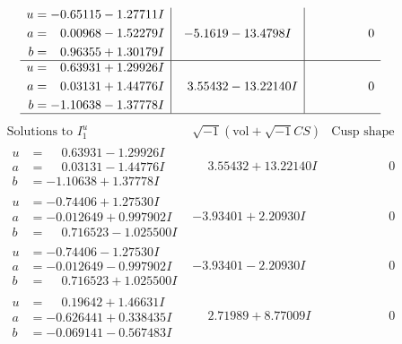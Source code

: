 \documentclass[1p]{elsarticle_modified}
\theoremstyle{definition}
\newcommand{\I}{\sqrt{-1}}
\begin{document}
$$\begin{array}{c|c|c}
\begin{aligned}
u &= -0.65115 - 1.27711 I \\
a &= \phantom{-}0.00968 - 1.52279 I \\
b &= \phantom{-}0.96355 + 1.30179 I\end{aligned}
 & -5.1619 - 13.4798 I & \phantom{-0.000000 } 0 \\ \hline\begin{aligned}
u &= \phantom{-}0.63931 + 1.29926 I \\
a &= \phantom{-}0.03131 + 1.44776 I \\
b &= -1.10638 - 1.37778 I\end{aligned}
 & \phantom{-}3.55432 - 13.22140 I & \phantom{-0.000000 } 0\\
 \hline 
 \end{array}$$\newpage$$\begin{array}{c|c|c}  
\text{Solutions to }I^u_{1}& \I (\text{vol} + \sqrt{-1}CS) & \text{Cusp shape}\\
 \hline 
\begin{aligned}
u &= \phantom{-}0.63931 - 1.29926 I \\
a &= \phantom{-}0.03131 - 1.44776 I \\
b &= -1.10638 + 1.37778 I\end{aligned}
 & \phantom{-}3.55432 + 13.22140 I & \phantom{-0.000000 } 0 \\ \hline\begin{aligned}
u &= -0.74406 + 1.27530 I \\
a &= -0.012649 + 0.997902 I \\
b &= \phantom{-}0.716523 - 1.025500 I\end{aligned}
 & -3.93401 + 2.20930 I & \phantom{-0.000000 } 0 \\ \hline\begin{aligned}
u &= -0.74406 - 1.27530 I \\
a &= -0.012649 - 0.997902 I \\
b &= \phantom{-}0.716523 + 1.025500 I\end{aligned}
 & -3.93401 - 2.20930 I & \phantom{-0.000000 } 0 \\ \hline\begin{aligned}
u &= \phantom{-}0.19642 + 1.46631 I \\
a &= -0.626441 + 0.338435 I \\
b &= -0.069141 - 0.567483 I\end{aligned}
 & \phantom{-}2.71989 + 8.77009 I & \phantom{-0.000000 } 0 \\ \hline\begin{aligned}

\end{aligned}
\end{array}$$
\end{document}
